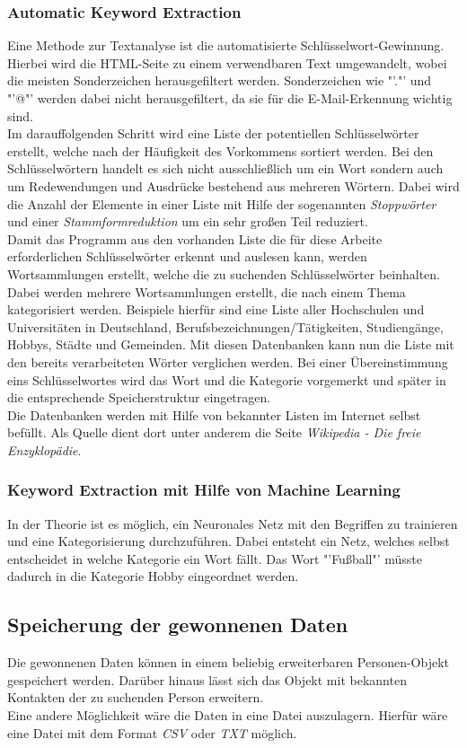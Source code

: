 		\subsubsection{Automatic Keyword Extraction}
		Eine Methode zur Textanalyse ist die automatisierte Schlüsselwort-Gewinnung. Hierbei wird die HTML-Seite zu einem verwendbaren Text umgewandelt, wobei die meisten Sonderzeichen herausgefiltert werden. Sonderzeichen wie "'."' und "'@"' werden dabei nicht herausgefiltert, da sie für die E-Mail-Erkennung wichtig sind.\\
		Im darauffolgenden Schritt wird eine Liste der potentiellen Schlüsselwörter erstellt, welche nach der Häufigkeit des Vorkommens sortiert werden. Bei den Schlüsselwörtern handelt es sich nicht ausschließlich um ein Wort sondern auch um Redewendungen und Ausdrücke bestehend aus mehreren Wörtern. Dabei wird die Anzahl der Elemente in einer Liste mit Hilfe der sogenannten \textit{Stoppwörter} und einer \textit{Stammformreduktion} um ein sehr großen Teil reduziert.\\
		Damit das Programm aus den vorhanden Liste die für diese Arbeite erforderlichen Schlüsselwörter erkennt und auslesen kann, werden Wortsammlungen erstellt, welche die zu suchenden Schlüsselwörter beinhalten. Dabei werden mehrere Wortsammlungen erstellt, die nach einem Thema kategorisiert werden. Beispiele hierfür sind eine Liste aller Hochschulen und Universitäten in Deutschland, Berufsbezeichnungen/Tätigkeiten, Studiengänge, Hobbys, Städte und Gemeinden. Mit diesen Datenbanken kann nun die Liste mit den bereits verarbeiteten Wörter verglichen werden. Bei einer Übereinstimmung eins Schlüsselwortes wird das Wort und die Kategorie vorgemerkt und später in die entsprechende Speicherstruktur eingetragen. \\
		Die Datenbanken werden mit Hilfe von bekannter Listen im Internet selbst befüllt. Als Quelle dient dort unter anderem die Seite \textit{Wikipedia - Die freie Enzyklopädie}. 
		\subsubsection{Keyword Extraction mit Hilfe von Machine Learning}
		In der Theorie ist es möglich, ein Neuronales Netz mit den Begriffen zu trainieren und eine Kategorisierung durchzuführen. Dabei entsteht ein Netz, welches selbst entscheidet in welche Kategorie ein Wort fällt. Das Wort "'Fußball"' müsste dadurch in die Kategorie Hobby eingeordnet werden.
	\subsection{Speicherung der gewonnenen Daten}
	Die gewonnenen Daten können in einem beliebig erweiterbaren Personen-Objekt gespeichert werden. Darüber hinaus lässt sich das Objekt mit bekannten Kontakten der zu suchenden Person erweitern.\\
	Eine andere Möglichkeit wäre die Daten in eine Datei auszulagern. Hierfür wäre eine Datei mit dem Format \textit{CSV} oder \textit{TXT} möglich.
	
